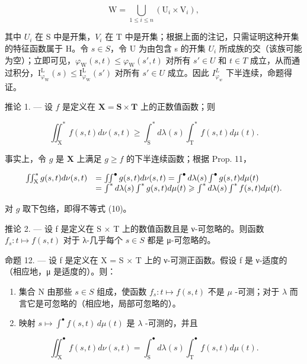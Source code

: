 \[
\mathrm{W} = \bigcup_ {1 \leqslant i \leqslant n} \left(\mathrm{U} _ {i} \times \mathrm{V} _ {i}\right),
\]

其中 \(U_{i}\) 在 S 中是开集，\(V_{i}\) 在 T 中是开集；根据上面的注记，只需证明这种开集的特征函数属于 H。令 \(s \in S\)，令 U 为由包含 s 的开集 \(U_{i}\) 所成族的交（该族可能为空）；立即可见，\(\varphi_{\mathrm{W}}(s,t) \leqslant \varphi_{\mathrm{W}}(s',t)\) 对所有 \(s' \in U\) 和 \(t \in T\) 成立，从而通过积分，\(\mathrm{I}_{\varphi_{\mathrm{W}}}^{\mathrm{L}}(s) \leqslant \mathrm{I}_{\varphi_{\mathrm{W}}}^{\mathrm{L}}(s')\) 对所有 \(s' \in U\) 成立。因此 \(I_{\varphi_{w}}^{L}\) 下半连续，命题得证。

推论 1. --- 设 \(f\) 是定义在 \(\mathbf{X} = \mathbf{S} \times \mathbf{T}\) 上的正数值函数；则

\[
\iint_ {\mathrm{X}} ^ {*} f (s, t) d \nu (s, t) \geqslant \int_ {\mathrm{S}} ^ {*} d \lambda (s) \int_ {\mathrm{T}} ^ {*} f (s, t) d \mu (t).\tag{10}
\]

事实上，令 \(g\) 是 \(\mathbf{X}\) 上满足 \(g \geqslant f\) 的下半连续函数；根据 Prop. 11，

\[
\begin{array}{r l} \iint_ {\mathrm{X}} ^ {*} g (s, t) d \nu (s, t) & = \iint^ {\bullet} g (s, t) d \nu (s, t) = \int^ {\bullet} d \lambda (s) \int^ {\bullet} g (s, t) d \mu (t) \\ & = \int^ {*} d \lambda (s) \int^ {*} g (s, t) d \mu (t) \geqslant \int^ {*} d \lambda (s) \int^ {*} f (s, t) d \mu (t). \end{array}
\]

对 \(g\) 取下包络，即得不等式 (10)。

推论 2. --- 设 f 是定义在 S × T 上的数值函数且是 ν-可忽略的。则函数 \(f_{s}: t \mapsto f(s, t)\) 对于 λ-几乎每个 \(s \in S\) 都是 μ-可忽略的。

命题 12. --- 设 f 是定义在 X = S × T 上的 ν-可测正函数。假设 f 是 ν-适度的（相应地，μ 是适度的）。则：

\begin{enumerate}
\def\labelenumi{\alph{enumi})}
\item
  集合 N 由那些 \(s \in S\) 组成，使函数 \(f_{s}: t \mapsto f(s, t)\) 不是 \(\mu\) -可测；对于 \(\lambda\) 而言它是可忽略的（相应地，局部可忽略的）。
\item
  映射 \(s \mapsto \int^{\bullet} f(s, t) \, d\mu(t)\) 是 \(\lambda\) -可测的，并且
\end{enumerate}

\[
\iint_ {\mathrm{X}} ^ {\bullet} f (s, t) d \nu (s, t) = \int_ {\mathrm{S}} ^ {\bullet} d \lambda (s) \int_ {\mathrm{T}} ^ {\bullet} f (s, t) d \mu (t).\tag{11}
\]

